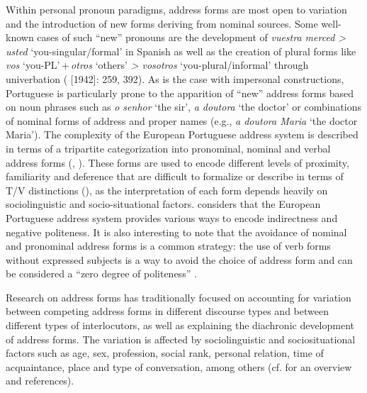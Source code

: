 \documentclass[output=paper]{langscibook}
\begin{document}
Within personal pronoun paradigms, address forms are most open to variation and the introduction of new forms deriving from nominal sources. Some well-known cases of such “new” pronouns are the development of \textit{vuestra merced > usted} ‘you-singular/formal’ in Spanish as well as the creation of plural forms like \textit{vos}  ‘you-PL’\,+\,\textit{otros}  ‘others’  \textit{> vosotros}  ‘you-plural/informal’ through univerbation (\citealt{Lapesa1981} [1942]: 259, 392). As is the case with impersonal constructions, Portuguese is particularly prone to the apparition of “new” address forms based on noun phrases such as \textit{o senhor}  ‘the sir’, \textit{a doutora}  ‘the doctor’ or combinations of nominal forms of address and proper names (e.g., \textit{a doutora Maria} ‘the doctor Maria’). The complexity of the European Portuguese address system is described in terms of a tripartite categorization into pronominal, nominal and verbal address forms (\citealt{Cintra1972}, ). These forms are used to encode different levels of proximity, familiarity and deference that are difficult to formalize or describe in terms of T/V distinctions (\citealt{BrownGilman1960}), as the interpretation of each form depends heavily on sociolinguistic and socio-situational factors. \citet{Carreira2005} considers that the European Portuguese address system provides various ways to encode indirectness and negative politeness. It is also interesting to note that the avoidance of nominal and pronominal address forms is a common strategy: the use of  verb forms without expressed subjects is a way to avoid the choice of address form and can be considered a “zero degree of politeness” \citep[313]{Carreira2005}.


Research on address forms has traditionally focused on accounting for variation between competing address forms in different discourse types and between different types of interlocutors, as well as explaining the diachronic development of address forms. The variation is affected by sociolinguistic and sociosituational factors such as age, sex, profession, social rank, personal relation, time of acquaintance, place and type of conversation, among others (cf. \citealt[627]{Uber2016} for an overview and references). 
\end{document}
